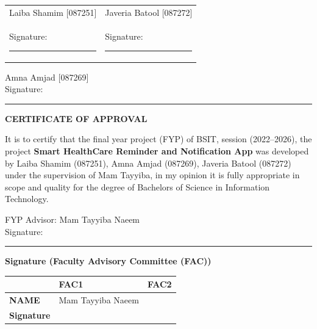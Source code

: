 \documentclass[12pt, a4paper, oneside]{report}
\begin{document}
\vspace{2cm}

\begin{tabular}{@{}p{}p{}@{}}
Laiba Shamim [087251] & Javeria Batool [087272] \\
Signature: \rule{4cm}{0.4pt} & Signature: \rule{4cm}{0.4pt} \\
\end{tabular}

\vspace{1.5cm}

Amna Amjad [087269]\\
Signature: \rule{4cm}{0.4pt}

\vfill

\newpage
\thispagestyle{empty}
\begin{center}
{\Large\bfseries CERTIFICATE OF APPROVAL}
\end{center}
\vspace{1cm}

It is to certify that the final year project (FYP) of BSIT, session (2022--2026), the project \textbf{Smart HealthCare Reminder and Notification App} was developed by Laiba Shamim (087251), Amna Amjad (087269), Javeria Batool (087272) under the supervision of Mam Tayyiba, in my opinion it is fully appropriate in scope and quality for the degree of Bachelors of Science in Information Technology.

\vspace{1.5cm}

FYP Advisor: Mam Tayyiba Naeem\\
Signature: \rule{5cm}{0.4pt}

\vspace{1cm}

\textbf{Signature (Faculty Advisory Committee (FAC))}

\vspace{0.5cm}

\begin{tabular}{|l|l|l|}
\hline
 & \textbf{FAC1} & \textbf{FAC2} \\ \hline
\textbf{NAME} & Mam Tayyiba Naeem & \\ \hline
\textbf{Signature} & & \\ \hline
\end{tabular}

\vspace{1.5cm}
\end{document}
